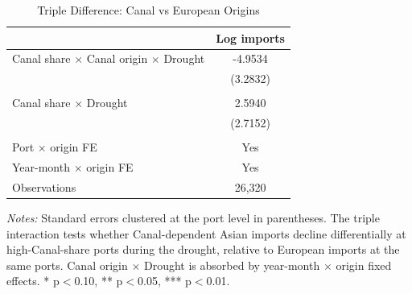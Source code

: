 \begin{table}[H]
\centering
\caption{Triple Difference: Canal vs European Origins}
\label{tab:triple}
\begin{threeparttable}
\begin{tabular}{lc}
\toprule
& Log imports \\
\midrule
Canal share $\times$ Canal origin $\times$ Drought & -4.9534 \\
& (3.2832) \\
\\
Canal share $\times$ Drought & 2.5940 \\
& (2.7152) \\
\\
Port $\times$ origin FE & Yes \\
Year-month $\times$ origin FE & Yes \\
Observations & 26,320 \\
\bottomrule
\end{tabular}
\begin{tablenotes}[flushleft]
\small
\item \textit{Notes:} Standard errors clustered at the port level in parentheses. The triple interaction tests whether Canal-dependent Asian imports decline differentially at high-Canal-share ports during the drought, relative to European imports at the same ports. Canal origin $\times$ Drought is absorbed by year-month $\times$ origin fixed effects. * p$<$0.10, ** p$<$0.05, *** p$<$0.01.
\end{tablenotes}
\end{threeparttable}
\end{table}
